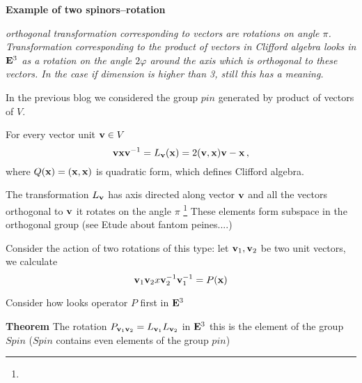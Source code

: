



\baselineskip=14pt
\def\vare {\varepsilon}
\def\t {\tilde}
\def\a {\alpha}
\def\K {{\bf K}}
\def\N {{\bf N}}
\def\C {{\bf C}}
\def\L {{\cal L}}
\def\E {{\bf E}}
\def\s {{\sigma}}
\def\S {{\Sigma}}
\def\p{\partial}
\def\vare{{\varepsilon}}
\def\Q {{\bf Q}}
\def\D {{\cal D}}
\def\G {{\Gamma}}
\def\Z {{\bf Z}}
\def\R  {{\bf R}}
\def\l {\lambda}
\def\ll {{\bf l}}
\def\degree {{\bf {\rm degree}\,\,}}
\def \finish {${\,\,\vrule height1mm depth2mm width 8pt}$}
\def \m {\medskip}
\def\p {\partial}
\def\r {{\bf r}}
\def\pt {{\bf p}}
\def\v {{\bf v}}
\def\n {{\bf n}}
\def\t {{\bf t}}
\def\b {{\bf b}}
\def\c {{\bf c }}
\def\e{{\bf e}}
\def\f{{\bf f}}
\def\ac {{\bf a}}
\def \X   {{\bf X}}
\def \Y   {{\bf Y}}
\def \x   {{\bf x}}
\def \y   {{\bf y}}
\def\w {{\omega}}
\def \Tr  {{\rm Tr\,}}
\def\dim {{\rm dim\,\,}}
\def\t {{\tilde}} 
\def\dist {{\hbox{\tt "distance"}}}
\def  \dim {{\rm dim\,}}
\def  \Im  {{\rm Im\,}}
\def  \ker {{\rm ker\,}}


\def \Cl {\hbox{\tt Cliff}}

\centerline   {\bf Example of two spinors--rotation}
{\it orthogonal transformation corresponding to vectors
are rotations on angle $\pi$.  Transformation
corresponding to the product of vectors in Clifford
algebra looks in $\E^3$ as a rotation on the angle
$2\varphi$ around the axis which is orthogonal to these
vectors.  In the case if dimension is higher than 3,
still this has a meaning.}


  In the previous blog we considered the group
      $pin$
 generated by product of vectors of $V$.

For every vector unit $\v\in V$
            $$
\v\x\v^{-1}=L_{\v}(\x)=2(\v,\x)\v-\x\,,
            $$
where $Q(\x)=(\x,\x)$  is quadratic form, which defines
Clifford algebra.

The transformation $L_\v$ has axis directed along vector $\v$
and all the vectors orthogonal to $\v$ it rotates on the
angle $\pi$ \footnote{} 
{These elements form subspace in the orthogonal group
 (see Etude about fantom peines....) 
}

Consider the action of two rotations of this type:
let $\v_1,\v_2$ be two unit vectors, we calculate
        $$
 \v_1\v_2 x\v_2^{-1}\v_1^{-1}=P(\x)
        $$

Consider how looks operator $P$ first in $\E^3$

{\bf Theorem}   The rotation
$P_{\v_1\v_2}=L_{\v_1}L_{\v_2}$
in  $\E^3$
this is the element of the group $Spin$
($Spin$ contains even elements of the group $pin$)

